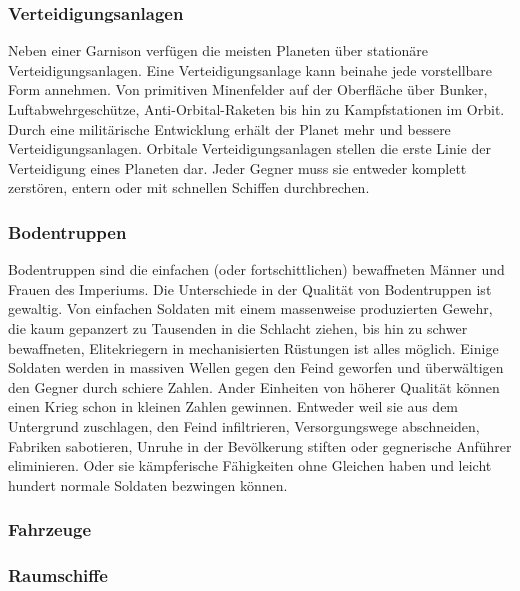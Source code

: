 \documentclass[11pt, a4paper]{article}
\begin{document}
\subsubsection{Verteidigungsanlagen}
Neben einer Garnison verfügen die meisten Planeten über stationäre Verteidigungsanlagen. Eine 
Verteidigungsanlage kann beinahe jede vorstellbare Form annehmen. Von primitiven Minenfelder auf der 
Oberfläche über Bunker, Luftabwehrgeschütze, Anti-Orbital-Raketen bis hin zu Kampfstationen im Orbit.
Durch eine militärische Entwicklung erhält der Planet mehr und bessere Verteidigungsanlagen. 
Orbitale Verteidigungsanlagen stellen die erste Linie der Verteidigung eines Planeten dar. Jeder Gegner muss
sie entweder komplett zerstören, entern oder mit schnellen Schiffen durchbrechen.
%
\subsubsection{Bodentruppen}
Bodentruppen sind die einfachen (oder fortschittlichen) bewaffneten Männer und Frauen des Imperiums.
Die Unterschiede in der Qualität von Bodentruppen ist gewaltig. Von einfachen Soldaten mit einem massenweise
produzierten Gewehr, die kaum gepanzert zu Tausenden in die Schlacht ziehen, bis hin zu schwer bewaffneten,
Elitekriegern in mechanisierten Rüstungen ist alles möglich. Einige Soldaten werden in massiven Wellen gegen
den Feind geworfen und überwältigen den Gegner durch schiere Zahlen. Ander Einheiten von höherer Qualität
können einen Krieg schon in kleinen Zahlen gewinnen. Entweder weil sie aus dem Untergrund zuschlagen, den 
Feind infiltrieren, Versorgungswege abschneiden, Fabriken sabotieren, Unruhe in der Bevölkerung stiften oder
gegnerische Anführer eliminieren. Oder sie kämpferische Fähigkeiten ohne Gleichen haben und leicht hundert 
normale Soldaten bezwingen können.
%
\subsubsection{Fahrzeuge}
%
\subsubsection{Raumschiffe}
\end{document}
